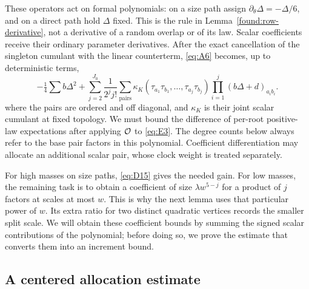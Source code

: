 These operators act on formal polynomials: on a size path assign
\(\partial_\theta\Delta=-\Delta/6\), and on a direct path hold
\(\Delta\) fixed. This is the rule in Lemma~\ref{found:row-derivative},
not a derivative of a random overlap or of its law. Scalar coefficients
receive their ordinary parameter derivatives. After the exact
cancellation of the singleton cumulant with the linear counterterm,
\eqref{eq:A6} becomes, up to deterministic terms,
\[
 -\tfrac14\sum b\Delta^2+
 \sum_{j=2}^{J_0}\frac1{2^j j!}
   \sum_{\text{pairs}}\kappa_K(\tau_{a_1}\tau_{b_1},\ldots,\tau_{a_j}\tau_{b_j})
                 \prod_{i=1}^j (b\Delta+d)_{a_i b_i}.                \tag{E1}\label{eq:E3}
\]
where the pairs are ordered and off diagonal, and \(\kappa_K\) is their
joint scalar cumulant at fixed topology. We must bound the difference
of per-root positive-law expectations after applying \({\cal O}\) to
\eqref{eq:E3}. The degree counts below always refer to the base pair factors in this
polynomial. Coefficient differentiation may allocate an additional scalar
pair, whose clock weight is treated separately.

For high masses on size paths, \eqref{eq:D15} gives the needed gain.
For low masses, the remaining task is to obtain a coefficient of size
\(\lambda w^{5-j}\) for a product of \(j\) factors at scales at most
\(w\). This is why the next lemma uses that particular power of
\(w\). Its extra ratio for two distinct quadratic vertices records
the smaller split scale. We will obtain these coefficient bounds by
summing the signed scalar contributions of the polynomial; before doing
so, we prove the estimate that converts them into an increment bound.

\subsection{A centered allocation estimate}

